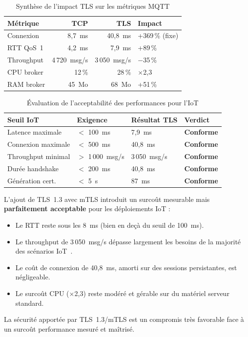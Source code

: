 \begin{table}[H]
\centering
\caption{Synthèse de l'impact TLS sur les métriques MQTT}
\label{tab:perf_summary}
\begin{tabular}{lrrl}
\toprule
\textbf{Métrique} & \textbf{TCP} & \textbf{TLS} & \textbf{Impact} \\
\midrule
Connexion & 8,7~ms & 40,8~ms & +369\,\% (fixe) \\
RTT QoS~1 & 4,2~ms & 7,9~ms & +89\,\% \\
Throughput & 4\,720~msg/s & 3\,050~msg/s & $-$35\,\% \\
CPU broker & 12\,\% & 28\,\% & $\times$2,3 \\
RAM broker & 45~Mo & 68~Mo & +51\,\% \\
\bottomrule
\end{tabular}
\end{table}

\begin{table}[H]
\centering
\caption{Évaluation de l'acceptabilité des performances pour l'IoT}
\label{tab:acceptability}
\begin{tabular}{llll}
\toprule
\textbf{Seuil IoT} & \textbf{Exigence} & \textbf{Résultat TLS} & \textbf{Verdict} \\
\midrule
Latence maximale & $<$ 100~ms & 7,9~ms & \textcolor{green!60!black}{\textbf{Conforme}} \\
Connexion maximale & $<$ 500~ms & 40,8~ms & \textcolor{green!60!black}{\textbf{Conforme}} \\
Throughput minimal & $>$ 1\,000~msg/s & 3\,050~msg/s & \textcolor{green!60!black}{\textbf{Conforme}} \\
Durée handshake & $<$ 200~ms & 40,8~ms & \textcolor{green!60!black}{\textbf{Conforme}} \\
Génération cert. & $<$ 5~s & 87~ms & \textcolor{green!60!black}{\textbf{Conforme}} \\
\bottomrule
\end{tabular}
\end{table}

\begin{resultbox}
L'ajout de TLS~1.3 avec mTLS introduit un surcoût mesurable mais \textbf{parfaitement acceptable} pour les déploiements IoT :
\begin{itemize}
  \item Le RTT reste sous les 8~ms (bien en deçà du seuil de 100~ms).
  \item Le throughput de 3\,050~msg/s dépasse largement les besoins de la majorité des scénarios IoT~\cite{nist_sp800213}.
  \item Le coût de connexion de 40,8~ms, amorti sur des sessions persistantes, est négligeable.
  \item Le surcoût CPU ($\times$2,3) reste modéré et gérable sur du matériel serveur standard.
\end{itemize}

La sécurité apportée par TLS~1.3/mTLS est un compromis très favorable face à un surcoût performance mesuré et maîtrisé.
\end{resultbox}

